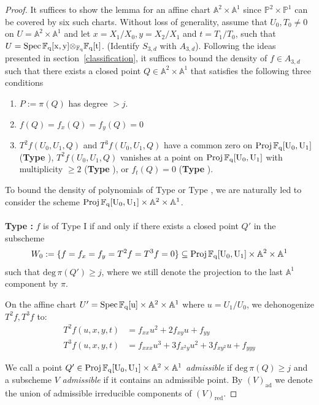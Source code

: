 \documentclass[12pt]{article}
\theoremstyle{plain}
\theoremstyle{definition}
\newcommand{\IA}{\mathbb{A}}
\newcommand{\IF}{\mathbb{F}}
\newcommand{\IP}{\mathbb{P}}
\renewcommand{\deg}{\mathrm{deg}\,}
\newcommand{\Spec}{\rm Spec\,}
\newcommand{\Proj}{\rm Proj\,}
\newcommand\tensor{{\otimes}}
\newcommand{\<}{\langle}
\renewcommand{\>}{\rangle}
\newcommand{\ad}{\mathrm{ad}}
\begin{document}
\begin{proof}
It suffices to show the lemma for an affine chart $\IA^2 \times \IA^1$ since $\IP^2 \times \IP^1$ can be covered by six such charts. Without loss of generality, assume that $U_0, T_0 \neq 0$ on $U = \IA^2 \times \IA^1$ and let $x = X_1/X_0, y = X_2/X_1$ and $t = T_1/T_0$, such that $U = \Spec \IF_q[x, y] \tensor_{\IF_q} \IF_q[t]$. (Identify $S_{3, d}$ with $A_{3, d}$). Following the ideas presented in section~\ref{classification}, it suffices to bound the density of $f \in A_{3, d}$ such that there exists a closed point $Q \in \IA^2 \times \IA^1$ that satisfies the following three conditions
\begin{enumerate}
\item $P := \pi(Q)$ has degree $> j$. 
\item $f(Q) = f_x(Q) = f_y(Q) = 0$
\item $T^2 f(U_0, U_1, Q)$ and $T^3 f(U_0, U_1, Q)$ have a common zero on $\Proj \IF_q[U_0, U_1]$ (\textbf{Type \uppercase\expandafter{}}), $T^2 f(U_0, U_1, Q)$ vanishes at a point on $\Proj \IF_q[U_0, U_1]$ with multiplicity $\ge 2$ (\textbf{Type \uppercase\expandafter{}}), or $f_t(Q) = 0$ (\textbf{Type \uppercase\expandafter{}}).
\end{enumerate}

To bound the density of polynomials of Type \uppercase\expandafter{} or Type \uppercase\expandafter{}, we are naturally led to consider the scheme $\Proj \IF_q[U_0, U_1] \times \IA^2 \times \IA^1$. \\\\
\textbf{Type \uppercase\expandafter{}: } $f$ is of Type I if and only if there exists a closed point $Q'$ in the subscheme
$$ W_0 := \{f = f_x = f_y = T^2 f = T^3 f = 0\} \subseteq \Proj \IF_q[U_0, U_1] \times \IA^2 \times \IA^1 $$
such that $\deg \pi(Q') \ge j$, where we still denote the projection to the last $\IA^1$ component by $\pi$. 

On the affine chart $U' = \Spec \IF_q[u] \times \IA^2 \times \IA^1$ where $u = U_1/U_0$, we dehonogenize $T^2 f, T^3 f$ to:
\begin{align*}
T^2 f(u, x, y, t) &= f_{xx} u^2 + 2 f_{xy} u + f_{yy} \\
T^3 f(u, x, y, t) &= f_{xxx} u^3 + 3 f_{x^2 y} u^2 + 3 f_{xy^2}u + f_{yyy} 
\end{align*}

We call a point $Q' \in \Proj \IF_q[U_0, U_1] \times \IA^2 \times \IA^1$ \textit{admissible} if $\deg \pi(Q) \ge j$ and a subscheme $V$ \textit{admissible} if it contains an admissible point. By $(V)_\ad$ we denote the union of admissible irreducible components of $(V)_{\mathrm{red}}$. 



\end{proof}
\end{document}

